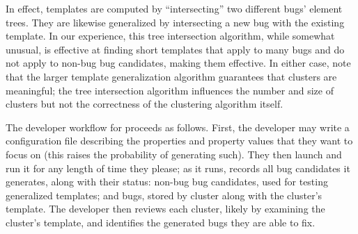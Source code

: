 In effect, templates are computed
  by ``intersecting'' two different bugs' element trees.
They are likewise generalized
  by intersecting a new bug with the existing template.
In our experience, this tree intersection algorithm,
  while somewhat unusual, is effective at finding
  short templates that apply to many bugs
  and do not apply to non-bug bug candidates,
  making them effective.
In either case, note that the larger template generalization algorithm
  guarantees that clusters are meaningful;
  the tree intersection algorithm influences
  the number and size of clusters but not
  the correctness of the clustering algorithm itself.

The developer workflow for \toolname proceeds as follows.
First, the developer may write a configuration file
  describing the properties and property values
  that they want \toolname to focus on
  (this raises the probability of generating such).
They then launch \toolname and run it
  for any length of time they please;
  as it runs, \toolname records all bug candidates it generates,
  along with their status:
  non-bug bug candidates, used for testing generalized templates;
  and bugs, stored by cluster along with the cluster's template.
The developer then reviews each cluster,
  likely by examining the cluster's template,
  and identifies the generated bugs they are able to fix.
